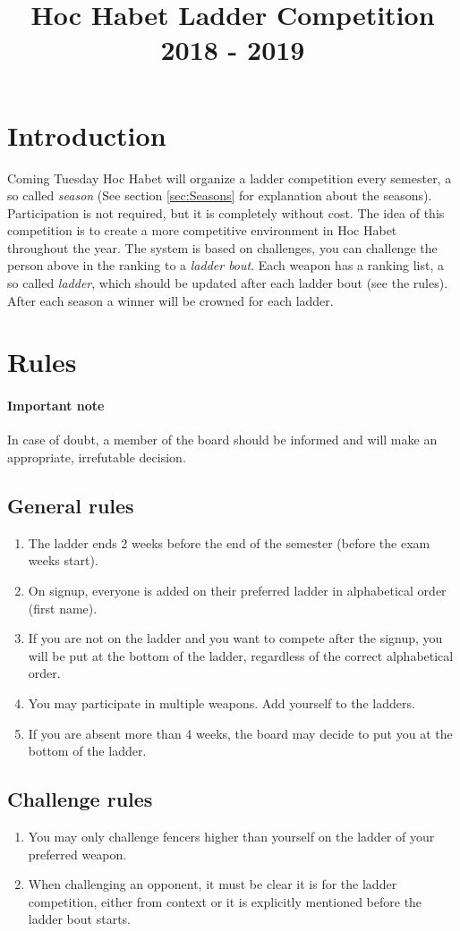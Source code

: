 \documentclass{article}
\title{Hoc Habet Ladder Competition \\ 2018 - 2019}
\author{}
\date{}
\begin{document}
\maketitle
\section{Introduction}
Coming Tuesday Hoc Habet will organize a ladder competition every semester, a so called \emph{season} (See section \ref{sec:Seasons} for explanation about the seasons). Participation is not required, but it is completely without cost. The idea of this competition is to create a more competitive environment in Hoc Habet throughout the year. The system is based on challenges, you can challenge the person above in the ranking to a \emph{ladder bout}. Each weapon has a ranking list, a so called \emph{ladder}, which should be updated after each ladder bout (see the rules). After each season a winner will be crowned for each ladder.

\section{Rules}
\paragraph{Important note} In case of doubt, a member of the board should be informed and will make an appropriate, irrefutable decision. 
\subsection{General rules}
\begin{enumerate}
    \item The ladder ends 2 weeks before the end of the semester (before the exam weeks start).
    \item On signup, everyone is added on their preferred ladder in alphabetical order (first name). 
    \item If you are not on the ladder and you want to compete after the signup, you will be put at the bottom of the ladder, regardless of the correct alphabetical order.
    \item You may participate in multiple weapons. Add yourself to the ladders.
    \item If you are absent more than 4 weeks, the board may decide to put you at the bottom of the ladder.
\end{enumerate}
\subsection{Challenge rules}
\begin{enumerate}
    \item You may only challenge fencers higher than yourself on the ladder of your preferred weapon.
    \item When challenging an opponent, it must be clear it is for the ladder competition, either from context or it is explicitly mentioned before the ladder bout starts.
\end{enumerate}
\end{document}
